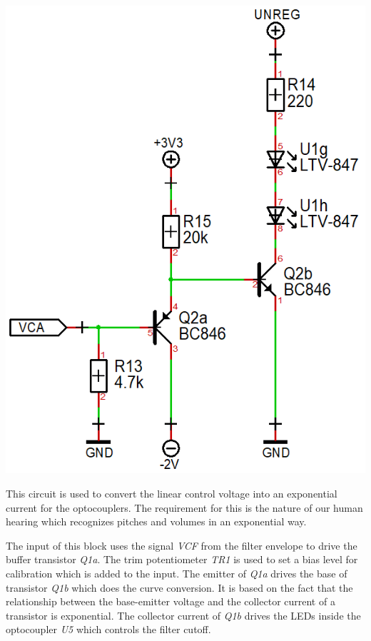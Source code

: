 \documentclass{scrartcl}
\begin{document}
\begin{center}
    \includegraphics[scale=0.40]{assets/schema-expo-vca.png}
\end{center}

This circuit is used to convert the linear control voltage into an exponential current for the optocouplers. The requirement for this is the nature of our human hearing which recognizes pitches and volumes in an exponential way.

The input of this block uses the signal \emph{VCF} from the filter envelope to drive the buffer transistor \emph{Q1a}. The trim potentiometer \emph{TR1} is used to set a bias level for calibration which is added to the input. The emitter of \emph{Q1a} drives the base of transistor \emph{Q1b} which does the curve conversion. It is based on the fact that the relationship between the base-emitter voltage and the collector current of a transistor is exponential. The collector current of \emph{Q1b} drives the LEDs inside the optocoupler \emph{U5} which controls the filter cutoff.
\end{document}
